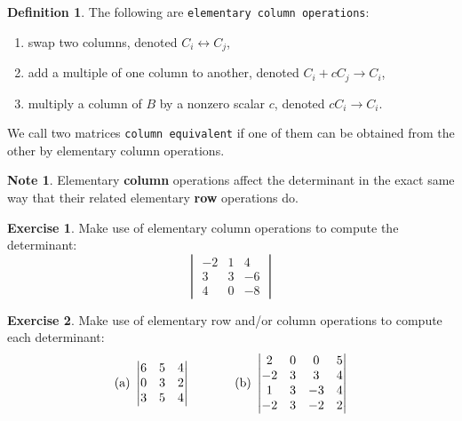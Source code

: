 \documentclass{beamer}
\newcommand{\fn}{\insertframenumber}
\theoremstyle{definition}
\newtheorem{exercise}{Exercise}
\newtheorem*{defn}{Definition}
\newtheorem*{nb}{Note}
\renewcommand{\emph}[1]{{\color{blue}\texttt{#1}}}
\begin{document}
\begin{frame}{\fn}
\begin{defn}
	The following are \emph{elementary column operations}:
	\begin{enumerate}[label=\textbf{\arabic*.}]
		\item swap two columns, denoted $C_i\leftrightarrow C_j$,
		\item add a multiple of one column to another, denoted $C_i+cC_j\rightarrow C_i$,
		\item multiply a column of $B$ by a nonzero scalar $c$, denoted $cC_i\rightarrow C_i$.
	\end{enumerate} 
	We call two matrices \emph{column equivalent} if one of them can be obtained from the other by elementary column operations.
\end{defn}
\begin{nb}
	Elementary \textbf{column} operations affect the determinant in the exact same way that their related elementary \textbf{row} operations do.
\end{nb}
\end{frame}
\begin{frame}{\fn}
\begin{exercise}
	Make use of elementary column operations to compute the determinant:
	\[\begin{vmatrix}
	-2 & 1 & 4 \\
	3 & 3 & -6 \\
	4 & 0 & -8
	\end{vmatrix}\]
\end{exercise}
\begin{exercise}
	Make use of elementary row and/or column operations to compute each determinant:
	\[\text{(a)}\ \begin{vmatrix}
	6 & 5 & 4 \\
	0 & 3 & 2 \\
	3 & 5 & 4
	\end{vmatrix}\hskip .5in \text{(b)}\ \begin{vmatrix}
	2 & 0 & 0 & 5 \\
	-2 & 3 & 3 & 4 \\
	1 & 3 & -3 & 4 \\
	-2 & 3 & -2 & 2
	\end{vmatrix}\]
\end{exercise}
\end{frame}
\end{document}
